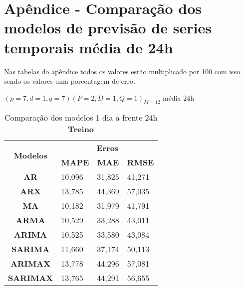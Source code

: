 
\section{Ap\^endice - Compara\c c\~ao dos modelos de previs\~ao de series temporais m\'edia de 24h}\label{sec:comtb24}

Nas tabelas do apêndice todos os valores estão multiplicado por 100 com isso sendo os valores uma porcentagem de erro.

$(p = 7,d = 1,q = 7) (P = 2,D = 1,Q = 1)_{M = 12}$ média 24h
	\begin{table}[H]
	\centering
	\caption{Comparação dos modelos 1 dia a frente 24h \textbf{Treino} }\label{tb:1-24trn}
	\begin{tabular}{@{}clll@{}}
		\toprule
		\multirow{2}{*}{\textbf{Modelos}} & \multicolumn{3}{c}{\textbf{Erros}}                                                                       \\ \cmidrule(l){2-4} 
		& \multicolumn{1}{c}{\textbf{MAPE}} & \multicolumn{1}{c}{\textbf{MAE}} & \multicolumn{1}{c}{\textbf{RMSE}} \\ \hline
\textbf{AR}                       & 10,096                            & 31,825                           & 41,271                            \\
\textbf{ARX}                      & 13,785                            & 44,369                           & 57,035                            \\
\textbf{MA}                       & 10,182                            & 31,979                           & 41,791                            \\
\textbf{ARMA}                     & 10,529                            & 33,288                           & 43,011                            \\
\textbf{ARIMA}                    & 10,525                            & 33,580                           & 43,084                            \\
\textbf{SARIMA}                   & 11,660                            & 37,174                           & 50,113                            \\
\textbf{ARIMAX}                   & 13,778                            & 44,296                           & 57,081                            \\
\textbf{SARIMAX}                  & 13,765                            & 44,291                           & 56,655                            \\

\end{tabular}
\end{table}
